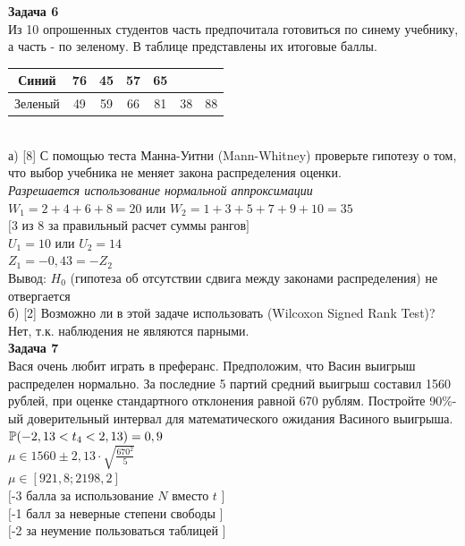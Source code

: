 \documentclass[12pt, a4paper]{article}\usepackage[]{graphicx}\usepackage[]{color}
\begin{document}
	{\bf Задача 6} \\
	Из 10 опрошенных студентов часть предпочитала готовиться по синему
	учебнику, а часть - по зеленому. В таблице представлены их
	итоговые баллы.  \\
	\begin{tabular}{|c|c|c|c|c|c|c|}
		\hline
		Синий & 76 & 45 & 57 & 65 &  &  \\
		\hline
		Зеленый & 49 & 59 & 66 & 81 & 38 & 88 \\
		\hline
	\end{tabular} \\
	а) [8] С помощью теста Манна-Уитни (Mann-Whitney) проверьте
	гипотезу о
	том, что выбор учебника не меняет закона распределения оценки. \\
	\emph{Разрешается использование нормальной аппроксимации} \\
	$W_{1}=2+4+6+8=20$ или $W_{2}=1+3+5+7+9+10=35$ \\
	$[$3 из 8 за правильный расчет суммы рангов$]$ \\
	$U_{1}=10$ или $U_{2}=14$ \\
	$Z_{1}=-0,43=-Z_{2}$ \\
	Вывод: $H_{0}$ (гипотеза об отсутствии сдвига между законами
	распределения) не отвергается \\
	б) [2] Возможно ли в этой задаче использовать (Wilcoxon Signed Rank Test)? \\
	Нет, т.к. наблюдения не являются парными. \\


	{\bf Задача 7} \\
	Вася очень любит играть в преферанс. Предположим, что Васин
	выигрыш распределен нормально. За последние 5 партий средний
	выигрыш составил 1560 рублей, при оценке стандартного отклонения
	равной 670 рублям. Постройте 90\%-ый доверительный интервал для
	математического ожидания Васиного выигрыша. \\
	$\P(-2,13<t_{4}<2,13)=0,9$ \\
	$\mu \in 1560 \pm 2,13\cdot \sqrt{\frac{670^{2}}{5}}$ \\
	$\mu \in [921,8;2198,2]$ \\
	$[$-3 балла за использование $N$ вместо $t$ $]$ \\
	$[$-1 балл за неверные степени свободы $]$ \\
	$[$-2 за неумение пользоваться таблицей $]$ \\
\end{document}
